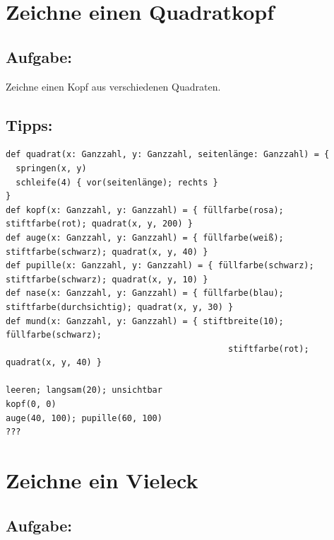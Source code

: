 \chapter{Zeichne einen Quadratkopf}\section*{\color{BrickRed}Aufgabe:}
Zeichne einen Kopf aus verschiedenen Quadraten.
\\


  
\section*{\color{OliveGreen}Tipps:}

\begin{lstlisting}[basicstyle={\ttfamily\fontsize{14}{17}\selectfont},numbers=none]
def quadrat(x: Ganzzahl, y: Ganzzahl, seitenlänge: Ganzzahl) = {
  springen(x, y)
  schleife(4) { vor(seitenlänge); rechts }
}
def kopf(x: Ganzzahl, y: Ganzzahl) = { füllfarbe(rosa); stiftfarbe(rot); quadrat(x, y, 200) }
def auge(x: Ganzzahl, y: Ganzzahl) = { füllfarbe(weiß); stiftfarbe(schwarz); quadrat(x, y, 40) }
def pupille(x: Ganzzahl, y: Ganzzahl) = { füllfarbe(schwarz); stiftfarbe(schwarz); quadrat(x, y, 10) }
def nase(x: Ganzzahl, y: Ganzzahl) = { füllfarbe(blau); stiftfarbe(durchsichtig); quadrat(x, y, 30) }
def mund(x: Ganzzahl, y: Ganzzahl) = { stiftbreite(10); füllfarbe(schwarz); 
                                            stiftfarbe(rot); quadrat(x, y, 40) }

leeren; langsam(20); unsichtbar
kopf(0, 0)
auge(40, 100); pupille(60, 100)
???
\end{lstlisting}
        
\chapter{Zeichne ein Vieleck}\section*{\color{BrickRed}Aufgabe:}


